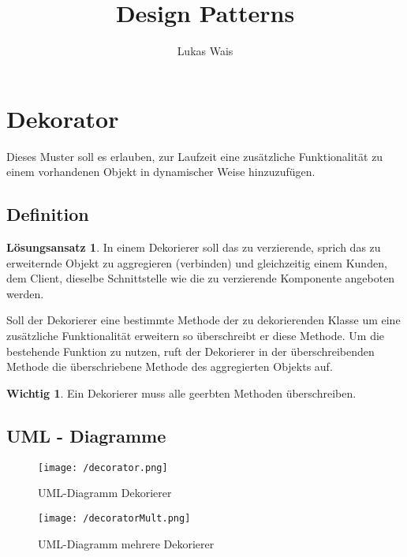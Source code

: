 \documentclass[12pt,a4paper,titlepage]{article}
\title{Design Patterns}
\author{Lukas Wais}
\theoremstyle{definition}
\newtheorem*{definition*}{Lösungsansatz}
\newtheorem*{remark*}{Wichtig}
\begin{document}
\maketitle

\section{Dekorator}
Dieses Muster soll es erlauben, zur Laufzeit eine zusätzliche Funktionalität zu einem vorhandenen Objekt in dynamischer Weise hinzuzufügen.
\subsection{Definition}
\begin{definition*}
In einem Dekorierer soll das zu verzierende, sprich das zu erweiternde Objekt zu aggregieren (verbinden) und gleichzeitig einem Kunden, dem Client, dieselbe Schnittstelle wie die zu verzierende Komponente angeboten werden.
\end{definition*}

Soll der Dekorierer eine bestimmte Methode der zu dekorierenden Klasse um eine zusätzliche Funktionalität erweitern so überschreibt er diese Methode. Um die bestehende Funktion zu nutzen, ruft der Dekorierer in der überschreibenden Methode die überschriebene Methode des aggregierten Objekts auf.

 \begin{remark*}
 Ein Dekorierer muss alle geerbten Methoden überschreiben.
 \end{remark*}

\subsection{UML - Diagramme}

\begin{figure}[htbp]
\begin{center}
\texttt{[image: /decorator.png]}

\caption{UML-Diagramm Dekorierer}
\label{default}
\end{center}
\end{figure}

\begin{figure}[htbp]
\begin{center}
\texttt{[image: /decoratorMult.png]}

\caption{UML-Diagramm mehrere Dekorierer}
\label{default}
\end{center}
\end{figure}
\end{document}
